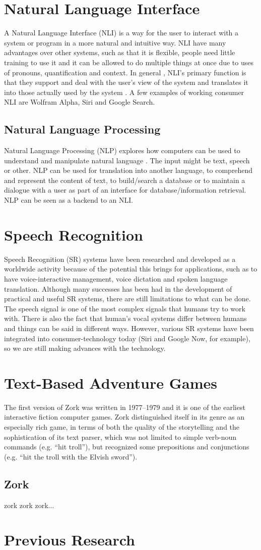 \section{Natural Language Interface}
A Natural Language Interface (NLI) is a way for the user to interact with a system or program in a more natural and intuitive way. NLI have many advantages over other systems, such as that it is flexible, people need little training to use it and it can be allowed to do multiple things at once due to uses of pronouns, quantification and context. In general , NLI’s primary function is that they support and deal with the user’s view of the system and translates it into those actually used by the system \citep{Hend}. A few examples of working consumer NLI are Wolfram Alpha, Siri and Google Search.

\subsection{Natural Language Processing}
Natural Language Processing (NLP) explores how computers can be used to understand and manipulate natural language \citep{Gobi}. The input might be text, speech or other. NLP can be used for translation into another language, to comprehend and represent the content of text, to build/search a database or to maintain a dialogue with a user as part of an interface for database/information retrieval. \citep{Allen} NLP can be seen as a backend to an NLI.

\section{Speech Recognition}
Speech Recognition (SR) systems have been researched and developed as a worldwide activity because of the potential this brings for applications, such as to have voice-interactive management, voice dictation and spoken language translation. Although many successes has been had in the development of practical and useful SR systems, there are still limitations to what can be done. The speech signal is one of the most complex signals that humans try to work with. There is also the fact that human’s vocal systems differ between humans and things can be said in different ways. However, various SR systems have been integrated into consumer-technology today (Siri and Google Now, for example), so we are still making advances with the technology. \citep{SR}

\section{Text-Based Adventure Games}
The first version of Zork was written in 1977–1979 and it is one of the earliest interactive fiction computer games. Zork distinguished itself in its genre as an especially rich game, in terms of both the quality of the storytelling and the sophistication of its text parser, which was not limited to simple verb-noun commands (e.g. ``hit troll''), but recognized some prepositions and conjunctions (e.g. ``hit the troll with the Elvish sword''). \citep{Zork}

\subsection{Zork}
zork zork zork...

\section{Previous Research}